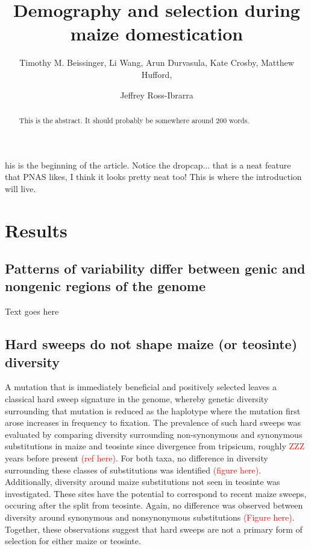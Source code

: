 \documentclass{pnastwo}
\begin{document}
\title{Demography and selection during maize domestication}
\author{Timothy M. Beissinger, Li Wang, Arun
  Durvasula, Kate Crosby, Matthew Hufford, \and Jeffrey
  Ross-Ibrarra }


\maketitle

\begin{article}

\begin{abstract}
This is the abstract. It should probably be somewhere around 200 words.
\end{abstract}

his is the beginning of the article. Notice the
dropcap... that is a neat feature that PNAS likes, I think it looks
pretty neat too! This is where the introduction will live.



\section{Results}
\subsection{Patterns of variability differ between genic and
  nongenic regions of the genome}
Text goes here

\subsection{Hard sweeps do not shape maize (or teosinte) diversity}
A mutation that is immediately beneficial and positively selected leaves a classical hard
sweep signature in the genome, whereby genetic diversity surrounding
that mutation is reduced as the haplotype where the mutation first
arose increases in frequency to fixation. The prevalence of such hard
sweeps was evaluated by comparing diversity
surrounding non-synonymous and synonymous substitutions in maize and
teosinte since divergence from tripsicum, roughly \textcolor{red}{ZZZ} years before
present \textcolor{red}{(ref here)}. For both taxa, no difference in diversity
surrounding these classes of substitutions was identified \textcolor{red}{(figure
here)}. Additionally, diversity around maize substitutions 
not seen in teosinte was investigated. These sites have the
potential to correspond to recent maize sweeps, occuring after the
split from teosinte. Again, no difference was observed
between diversity around synonymous and nonsynonymous
substitutions \textcolor{red}{(Figure here)}. Together, these observations suggest that hard sweeps
are not a primary form of selection for either maize or teosinte.


\end{article}
\end{document}
